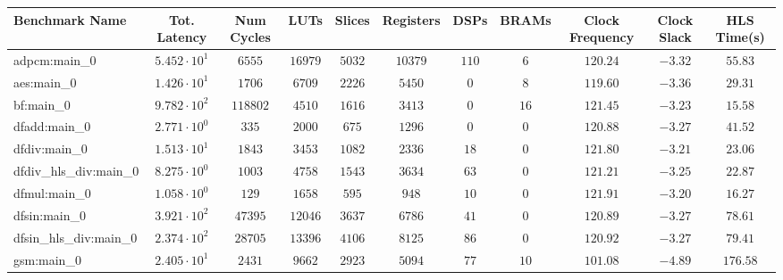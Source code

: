\begin{tabular}{|l|c|c|c|c|c|c|c|c|c|c|}
\hline
Benchmark Name          & Tot. Latency           & Num Cycles & LUTs       & Slices    & Registers & DSPs    & BRAMs   & Clock Frequency & Clock Slack & HLS Time(s) \\
\hline
adpcm:main\_0           & $ 5.452 \cdot 10^{1} $ & $ 6555   $ & $ 16979  $ & $ 5032  $ & $ 10379 $ & $ 110 $ & $ 6   $ & $ 120.24      $ & $ -3.32   $ & $ 55.83   $ \\
aes:main\_0             & $ 1.426 \cdot 10^{1} $ & $ 1706   $ & $ 6709   $ & $ 2226  $ & $ 5450  $ & $ 0   $ & $ 8   $ & $ 119.60      $ & $ -3.36   $ & $ 29.31   $ \\
bf:main\_0              & $ 9.782 \cdot 10^{2} $ & $ 118802 $ & $ 4510   $ & $ 1616  $ & $ 3413  $ & $ 0   $ & $ 16  $ & $ 121.45      $ & $ -3.23   $ & $ 15.58   $ \\
dfadd:main\_0           & $ 2.771 \cdot 10^{0} $ & $ 335    $ & $ 2000   $ & $ 675   $ & $ 1296  $ & $ 0   $ & $ 0   $ & $ 120.88      $ & $ -3.27   $ & $ 41.52   $ \\
dfdiv:main\_0           & $ 1.513 \cdot 10^{1} $ & $ 1843   $ & $ 3453   $ & $ 1082  $ & $ 2336  $ & $ 18  $ & $ 0   $ & $ 121.80      $ & $ -3.21   $ & $ 23.06   $ \\
dfdiv\_hls\_div:main\_0 & $ 8.275 \cdot 10^{0} $ & $ 1003   $ & $ 4758   $ & $ 1543  $ & $ 3634  $ & $ 63  $ & $ 0   $ & $ 121.21      $ & $ -3.25   $ & $ 22.87   $ \\
dfmul:main\_0           & $ 1.058 \cdot 10^{0} $ & $ 129    $ & $ 1658   $ & $ 595   $ & $ 948   $ & $ 10  $ & $ 0   $ & $ 121.91      $ & $ -3.20   $ & $ 16.27   $ \\
dfsin:main\_0           & $ 3.921 \cdot 10^{2} $ & $ 47395  $ & $ 12046  $ & $ 3637  $ & $ 6786  $ & $ 41  $ & $ 0   $ & $ 120.89      $ & $ -3.27   $ & $ 78.61   $ \\
dfsin\_hls\_div:main\_0 & $ 2.374 \cdot 10^{2} $ & $ 28705  $ & $ 13396  $ & $ 4106  $ & $ 8125  $ & $ 86  $ & $ 0   $ & $ 120.92      $ & $ -3.27   $ & $ 79.41   $ \\
gsm:main\_0             & $ 2.405 \cdot 10^{1} $ & $ 2431   $ & $ 9662   $ & $ 2923  $ & $ 5094  $ & $ 77  $ & $ 10  $ & $ 101.08      $ & $ -4.89   $ & $ 176.58  $ \\

\end{tabular}
